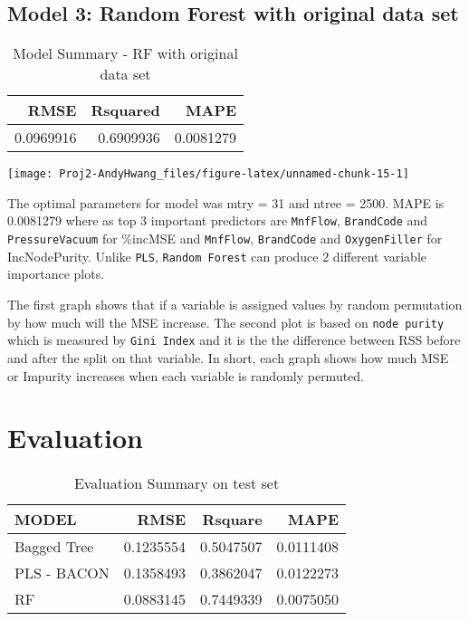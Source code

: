 \documentclass[]{report}
\begin{document}
\section{Model 3: Random Forest with original data
set}\label{model-3-random-forest-with-original-data-set}

\begin{table}[H]

\caption{\label{tab:unnamed-chunk-15}Model Summary - RF with original data set}
\centering
\fontsize{8}{10}\selectfont
\begin{tabular}[t]{rrr}
\toprule
\textbf{RMSE} & \textbf{Rsquared} & \textbf{MAPE}\\
\midrule
\rowcolor{gray!6}  0.0969916 & 0.6909936 & 0.0081279\\
\bottomrule
\end{tabular}
\end{table}

\begin{center}\texttt{[image: Proj2-AndyHwang\_files/figure-latex/unnamed-chunk-15-1]} \end{center}

The optimal parameters for model was mtry = 31 and ntree = 2500. MAPE is
0.0081279 where as top 3 important predictors are \texttt{MnfFlow},
\texttt{BrandCode} and \texttt{PressureVacuum} for \%incMSE and
\texttt{MnfFlow}, \texttt{BrandCode} and \texttt{OxygenFiller} for
IncNodePurity. Unlike \texttt{PLS}, \texttt{Random\ Forest} can produce
2 different variable importance plots.

The first graph shows that if a variable is assigned values by random
permutation by how much will the MSE increase. The second plot is based
on \texttt{node\ purity} which is measured by \texttt{Gini\ Index} and
it is the the difference between RSS before and after the split on that
variable. In short, each graph shows how much MSE or Impurity increases
when each variable is randomly permuted.

\chapter{Evaluation}\label{evaluation}

\begin{table}[H]

\caption{\label{tab:unnamed-chunk-16}Evaluation Summary on test set}
\centering
\fontsize{8}{10}\selectfont
\begin{tabular}[t]{lrrr}
\toprule
\textbf{MODEL} & \textbf{RMSE} & \textbf{Rsquare} & \textbf{MAPE}\\
\midrule
\rowcolor{gray!6}  Bagged Tree & 0.1235554 & 0.5047507 & 0.0111408\\
PLS - BACON & 0.1358493 & 0.3862047 & 0.0122273\\
\rowcolor{gray!6}  RF & 0.0883145 & 0.7449339 & 0.0075050\\
\bottomrule
\end{tabular}
\end{table}
\end{document}
